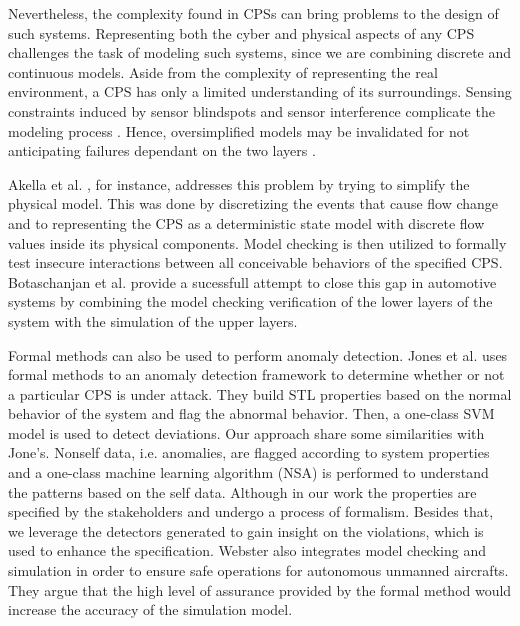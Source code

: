 
Nevertheless, the complexity found in CPSs can bring problems to the design of such systems. 
Representing both the cyber and physical aspects of any CPS challenges the task of modeling such systems, since we are combining discrete and continuous models. Aside from the complexity of representing the real environment, a CPS has only a limited understanding of its surroundings. Sensing constraints induced by sensor blindspots and sensor interference complicate the modeling process \cite{luckcuck2019formal}. Hence, oversimplified models may be invalidated for not anticipating failures dependant on the two layers \cite{2014PerceptionsSOTAV&VCPS}. 

Akella et al. \cite{akella2009model}, for instance, addresses this problem by trying to simplify the physical model. This was done by discretizing the events that cause flow change and to representing the CPS as a deterministic state model with discrete flow values inside its physical components. Model checking is then utilized to formally test insecure interactions between all conceivable behaviors of the specified CPS. Botaschanjan et al. \cite{botaschanjan2008correctness} provide a sucessfull attempt to close this gap in automotive systems by combining the model checking verification of the lower layers of the system with the simulation of the upper layers.

Formal methods can also be used to perform anomaly detection. Jones et al. \cite{jones2014anomaly} uses formal methods to an anomaly detection framework to determine whether or not a particular CPS is under attack. They build STL properties based on the normal behavior of the system and flag the abnormal behavior. Then, a one-class SVM model is used to detect deviations. Our approach share some similarities with Jone's. Nonself data, i.e. anomalies, are flagged according to system properties and a one-class machine learning algorithm (NSA) is performed to understand the patterns based on the self data. Although in our work the properties are specified by the stakeholders and undergo a process of formalism. Besides that, we leverage the detectors generated to gain insight on the violations, which is used to enhance the specification. Webster \cite{webster2014generating} also integrates model checking and simulation in order to ensure safe operations for autonomous unmanned aircrafts. They argue that the high level of assurance provided by the formal method would increase the accuracy of the simulation model.

